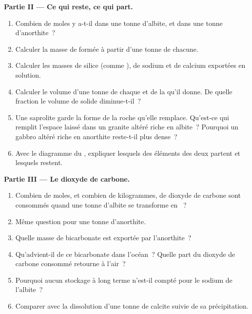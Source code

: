 \begin{problem}
\medskip
\noindent\textbf{Partie II --- Ce qui reste, ce qui part.}
\begin{enumerate}[resume]
  \item Combien de moles y a-t-il dans une tonne d'albite, et dans une tonne
        d'anorthite~?
  \item Calculer la masse de  formée à partir d'une tonne de chacune.
  \item Calculer les masses de silice (comme ), de sodium et de calcium
        exportées en solution.
  \item Calculer le volume d'une tonne de chaque  et de la  qu'il
        donne. De quelle fraction le volume de solide diminue-t-il~?
  \item Une saprolite garde la forme de la roche qu'elle remplace. Qu'est-ce qui remplit
        l'espace laissé dans un granite altéré riche en albite~? Pourquoi un gabbro
        altéré riche en anorthite reste-t-il plus dense~?
  \item Avec le diagramme du , expliquer lesquels des éléments des
        deux  partent et lesquels restent.
\end{enumerate}

\medskip
\noindent\textbf{Partie III --- Le dioxyde de carbone.}
\begin{enumerate}[resume]
  \item Combien de moles, et combien de kilogrammes, de dioxyde de carbone sont consommés
        quand une tonne d'albite se transforme en ~?
  \item Même question pour une tonne d'anorthite.
  \item Quelle masse de bicarbonate est exportée par l'anorthite~?
  \item Qu'advient-il de ce bicarbonate dans l'océan~? Quelle part du dioxyde de carbone
        consommé retourne à l'air~?
  \item Pourquoi aucun stockage à long terme n'est-il compté pour le sodium de l'albite~?
  \item Comparer avec la dissolution d'une tonne de calcite suivie de sa
        précipitation.
\end{enumerate}


\end{problem}

